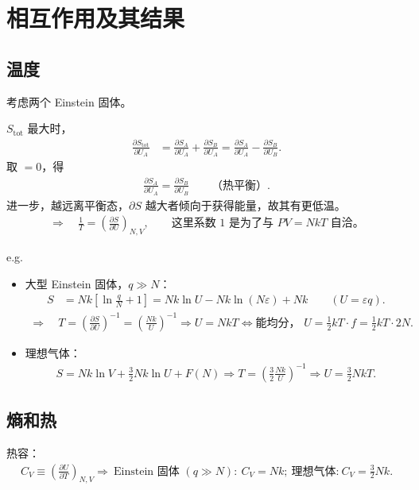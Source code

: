 \chapter{相互作用及其结果}

\section{温度}
考虑两个 Einstein 固体。

$S_{\mathrm{tot}}$ 最大时，
\begin{align}
\frac{\partial S_{\mathrm{tot}}}{\partial U_A}
&=\frac{\partial S_A}{\partial U_A}+\frac{\partial S_B}{\partial U_A}
=\frac{\partial S_A}{\partial U_A}-\frac{\partial S_B}{\partial U_B}.
\end{align}
取 $=0$，得
\begin{align}
\frac{\partial S_A}{\partial U_A}=\frac{\partial S_B}{\partial U_B}\qquad \text{（热平衡）}.
\end{align}
进一步，越远离平衡态，$\partial S$ 越大者倾向于获得能量，故其有更低温。
\begin{align}
\Rightarrow\quad \frac{1}{T}=\left(\frac{\partial S}{\partial U}\right)_{N,V},
\qquad \text{这里系数 $1$ 是为了与 }PV=NkT\text{ 自洽。}
\end{align}

e.g.
\begin{itemize}
\item 大型 Einstein 固体，$q\gg N$：
\begin{align}
S&=Nk\left[\ln\frac{q}{N}+1\right]
=Nk\ln U-Nk\ln(N\varepsilon)+Nk\qquad (U=\varepsilon q).
\end{align}
\begin{align}
\Rightarrow\quad T=\left(\frac{\partial S}{\partial U}\right)^{-1}=\left(\frac{Nk}{U}\right)^{-1}
\Rightarrow U=NkT\iff \text{能均分， }U=\frac{1}{2}kT\cdot f=\frac{1}{2}kT\cdot 2N.
\end{align}

\item 理想气体：
\begin{align}
S=Nk\ln V+\frac{3}{2}Nk\ln U+F(N)
\Rightarrow T=\left(\frac{3}{2}\frac{Nk}{U}\right)^{-1}
\Rightarrow U=\frac{3}{2}NkT.
\end{align}
\end{itemize}

\section{熵和热}
热容：
\begin{align}
C_V\equiv\left(\frac{\partial U}{\partial T}\right)_{N,V}
\Rightarrow\ \text{Einstein 固体 }(q\gg N):\ C_V=Nk;\ \text{理想气体:}\ C_V=\frac{3}{2}Nk.
\end{align}

